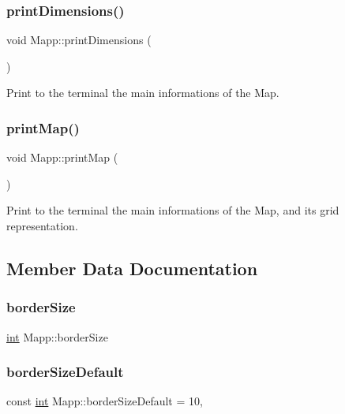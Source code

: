 \subsubsection{\texorpdfstring{printDimensions()}{printDimensions()}}
{\footnotesize\ttfamily void Mapp\+::print\+Dimensions (\begin{DoxyParamCaption}{ }\end{DoxyParamCaption})}



Print to the terminal the main informations of the Map. 

\mbox{\label{class_mapp_ab795b79c5d655f6a62303c4a415ee73c}} 
\subsubsection{\texorpdfstring{printMap()}{printMap()}}
{\footnotesize\ttfamily void Mapp\+::print\+Map (\begin{DoxyParamCaption}{ }\end{DoxyParamCaption})}



Print to the terminal the main informations of the Map, and its grid representation. 



\subsection{Member Data Documentation}
\mbox{\label{class_mapp_a396e22007b8acd6231f9bd91d263f84f}} 
\subsubsection{\texorpdfstring{borderSize}{borderSize}}
{\footnotesize\ttfamily \mbox{\hyperlink{draw_8hh_aa620a13339ac3a1177c86edc549fda9b}{int}} Mapp\+::border\+Size\hspace{0.3cm}{\ttfamily [protected]}}

\mbox{\label{class_mapp_aef8bde83114714a4ce4ad9d13766e761}} 
\subsubsection{\texorpdfstring{borderSizeDefault}{borderSizeDefault}}
{\footnotesize\ttfamily const \mbox{\hyperlink{draw_8hh_aa620a13339ac3a1177c86edc549fda9b}{int}} Mapp\+::border\+Size\+Default = 10\hspace{0.3cm}{\ttfamily [static]}, {\ttfamily [protected]}}

